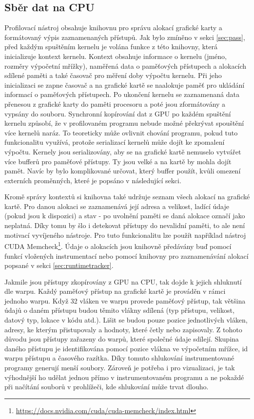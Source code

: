 \subsection{Sběr dat na CPU}
\label{sec:cpucollection}
Profilovací nástroj obsahuje knihovnu pro správu alokací grafické karty a formátovaný výpis zaznamenaných přístupů. Jak bylo zmíněno v sekci \ref{sec:pass}, před každým spuštěním kernelu je volána funkce z této knihovny, která inicializuje kontext kernelu. Kontext obsahuje informace o kernelu (jméno, rozměry výpočetní mřížky), naměřená data o paměťových přístupech a alokacích sdílené paměti a také časovač pro měření doby výpočtu kernelu. Při jeho inicializaci se zapne časovač a na grafické kartě se naalokuje paměť pro ukládání informací o paměťových přístupech. Po ukončení kernelu se zaznamenaná data přenesou z grafické karty do paměti procesoru a poté jsou zformátovány a vypsány do souboru. 
Synchronní kopírování dat z GPU po každém spuštění kernelu způsobí, že v profilovaném programu nebude možné překrývat spouštění více kernelů naráz. To teoreticky může ovlivnit chování programu, pokud tuto funkcionalitu využívá, protože serializací kernelů může dojít ke zpomalení výpočtu. Kernely jsou serializovány, aby se na grafické kartě nemuselo vytvářet více bufferů pro paměťové přístupy. Ty jsou velké a na kartě by mohla dojít pamět. Navíc by bylo komplikované určovat, který buffer použít, kvůli omezení externích proměnných, které je popsáno v následující sekci.

Kromě správy kontextů si knihovna také udržuje seznam všech alokací na grafické kartě. Pro danou alokaci se zaznamenává její adresa a velikost, ladící údaje (pokud jsou k dispozici) a stav - po uvolnění paměti se daná alokace označí jako neplatná. Díky tomu by šlo i detekovat přístupy do nevalidní paměti, to ale není motivací vyvíjeného nástroje. Pro tuto funkcionalitu lze použít například nástroj CUDA Memcheck\footnote{\url{https://docs.nvidia.com/cuda/cuda-memcheck/index.html}}. Údaje o alokacích jsou knihovně předávány buď pomocí funkcí vložených instrumentací nebo pomocí knihovny pro zaznamenávání alokací popsané v sekci \ref{sec:runtimetracker}.

Jakmile jsou přístupy zkopírovány z GPU na CPU, tak dojde k jejich shluknutí dle warpu. Každý paměťový přístup na grafické kartě je prováděn v rámci jednoho warpu. Když 32 vláken ve warpu provede paměťový přístup, tak většina údajů o daném přístupu budou těmito vlákny sdílená (typ přístupu, velikost, datový typ, lokace v kódu atd.). Lišit se budou pouze pozice jednotlivých vláken, adresy, ke kterým přistupovaly a hodnoty, které četly nebo zapisovaly. Z tohoto důvodu jsou přístupy zařazeny do warpů, které společné údaje sdílejí. Skupina daného přístupu je identifikována pomocí pozice vlákna ve výpočetním mřížce, id warpu přístupu a časového razítka. Díky tomuto shlukování instrumentované programy generují menší soubory. Zároveň je potřeba i pro vizualizaci, je tak výhodnější ho udělat jednou přímo v instrumentovaném programu a ne pokaždé při načítání souborů v prohlížeči, kde shlukování může trvat dlouho.

